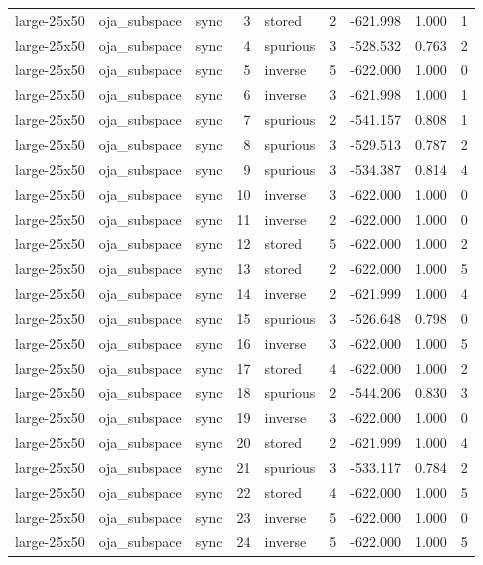 \begin{tabular}{lllrlrrrr}
large-25x50 & oja\_subspace & sync & 3 & stored & 2 & -621.998 & 1.000 & 1 \\
large-25x50 & oja\_subspace & sync & 4 & spurious & 3 & -528.532 & 0.763 & 2 \\
large-25x50 & oja\_subspace & sync & 5 & inverse & 5 & -622.000 & 1.000 & 0 \\
large-25x50 & oja\_subspace & sync & 6 & inverse & 3 & -621.998 & 1.000 & 1 \\
large-25x50 & oja\_subspace & sync & 7 & spurious & 2 & -541.157 & 0.808 & 1 \\
large-25x50 & oja\_subspace & sync & 8 & spurious & 3 & -529.513 & 0.787 & 2 \\
large-25x50 & oja\_subspace & sync & 9 & spurious & 3 & -534.387 & 0.814 & 4 \\
large-25x50 & oja\_subspace & sync & 10 & inverse & 3 & -622.000 & 1.000 & 0 \\
large-25x50 & oja\_subspace & sync & 11 & inverse & 2 & -622.000 & 1.000 & 0 \\
large-25x50 & oja\_subspace & sync & 12 & stored & 5 & -622.000 & 1.000 & 2 \\
large-25x50 & oja\_subspace & sync & 13 & stored & 2 & -622.000 & 1.000 & 5 \\
large-25x50 & oja\_subspace & sync & 14 & inverse & 2 & -621.999 & 1.000 & 4 \\
large-25x50 & oja\_subspace & sync & 15 & spurious & 3 & -526.648 & 0.798 & 0 \\
large-25x50 & oja\_subspace & sync & 16 & inverse & 3 & -622.000 & 1.000 & 5 \\
large-25x50 & oja\_subspace & sync & 17 & stored & 4 & -622.000 & 1.000 & 2 \\
large-25x50 & oja\_subspace & sync & 18 & spurious & 2 & -544.206 & 0.830 & 3 \\
large-25x50 & oja\_subspace & sync & 19 & inverse & 3 & -622.000 & 1.000 & 0 \\
large-25x50 & oja\_subspace & sync & 20 & stored & 2 & -621.999 & 1.000 & 4 \\
large-25x50 & oja\_subspace & sync & 21 & spurious & 3 & -533.117 & 0.784 & 2 \\
large-25x50 & oja\_subspace & sync & 22 & stored & 4 & -622.000 & 1.000 & 5 \\
large-25x50 & oja\_subspace & sync & 23 & inverse & 5 & -622.000 & 1.000 & 0 \\
large-25x50 & oja\_subspace & sync & 24 & inverse & 5 & -622.000 & 1.000 & 5 \\

\end{tabular}
